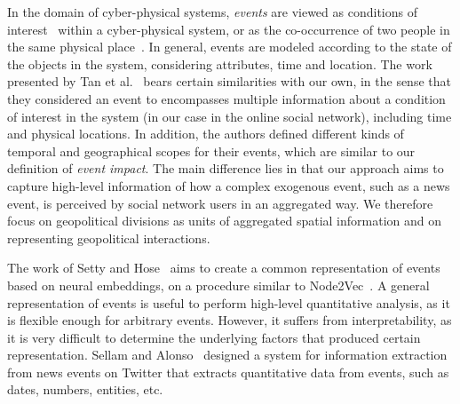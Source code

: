 In the domain of cyber-physical systems, {\em events} are viewed as conditions
of interest~\cite{st-model_2009} within a cyber-physical system, or as the
co-occurrence of two people in the same physical place~\cite{STEvent_2010}.
%
In general, events are modeled according to the state of the objects in the
system, considering attributes, time and location.
%
The work presented by Tan et al.~\cite{st-model_2009} bears certain similarities
with our own, in the sense that they considered an event to encompasses multiple
information about a condition of interest in the system (in our case in the
online social network), including time and physical locations. 
%
In addition, the authors defined different kinds of temporal and geographical
scopes for their events, which are similar to our definition of {\em event
impact}. 
%
The main difference lies in that our approach aims to capture high-level
information of how a complex exogenous event, such as a news event, is perceived
by social network users in an aggregated way. 
%
We therefore focus on geopolitical divisions as units of aggregated spatial
information and on representing geopolitical interactions.

The work of Setty and Hose~\cite{Setty:2018:ENE:3209978.3210136} aims to create
a common representation of events based on neural embeddings, on a procedure
similar to Node2Vec~\cite{Grover:2016:NSF:2939672.2939754}.
%
A general representation of events is useful to perform high-level quantitative
analysis, as it is flexible enough for arbitrary events.
%
However, it suffers from interpretability, as it is very difficult to determine
the underlying factors that produced certain representation.
%
Sellam and Alonso~\cite{10.1007/978-3-319-19890-3_17} designed a system for
information extraction from news events on Twitter that extracts quantitative
data from events, such as dates, numbers, entities, etc.
%
